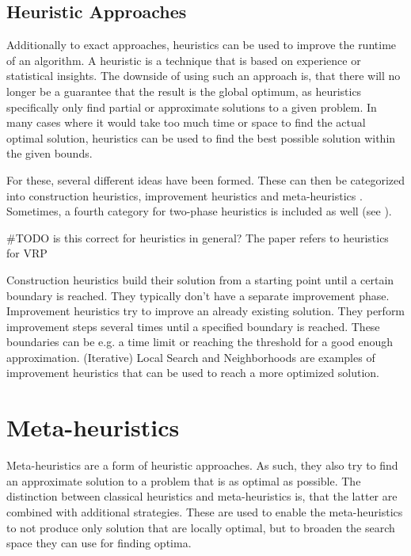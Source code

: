 \subsection{Heuristic Approaches}

Additionally to exact approaches, heuristics can be used to improve the runtime of an algorithm.
A heuristic is a technique that is based on experience or statistical insights.
The downside of using such an approach is, that there will no longer be a guarantee that the result is the global optimum, as heuristics specifically only find partial or approximate solutions to a given problem. 
In many cases where it would take too much time or space to find the actual optimal solution, heuristics can be used to find the best possible solution within the given bounds.

For these, several different ideas have been formed. 
These can then be categorized into construction heuristics, improvement heuristics and meta-heuristics \cite{ropke_heuristic_2005}.
Sometimes, a fourth category for two-phase heuristics is included as well (see \cite{}).

\#TODO is this correct for heuristics in general? The paper refers to heuristics for VRP

Construction heuristics build their solution from a starting point until a certain boundary is reached. 
They typically don't have a separate improvement phase.
Improvement heuristics try to improve an already existing solution.
They perform improvement steps several times until a specified boundary is reached.
These boundaries can be e.g. a time limit or reaching the threshold for a good enough approximation.
(Iterative) Local Search and Neighborhoods are examples of improvement heuristics that can be used to reach a more optimized solution. \cite{laporte_5_2002, ropke_heuristic_2005}



\section{Meta-heuristics}
\label{sec:metaHeuristics}

Meta-heuristics are a form of heuristic approaches.
As such, they also try to find an approximate solution to a problem that is as optimal as possible.
The distinction between classical heuristics and meta-heuristics is, that the latter are combined with additional strategies.
These are used to enable the meta-heuristics to not produce only solution that are locally optimal, but to broaden the search space they can use for finding optima.

